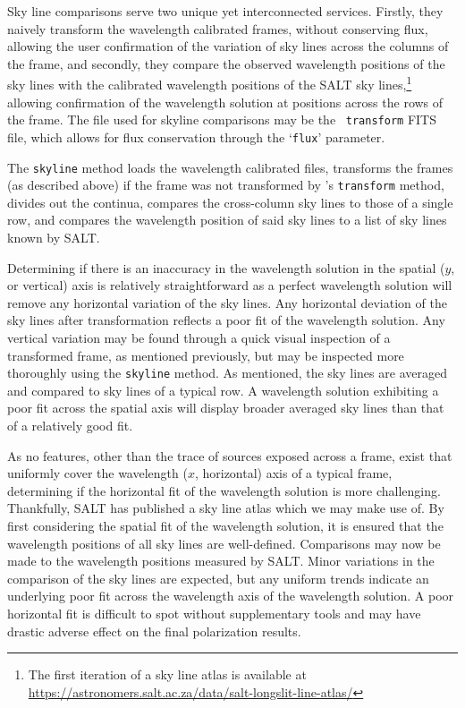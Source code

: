 Sky line comparisons serve two unique yet interconnected services. Firstly, they naively transform the wavelength calibrated frames, without conserving flux, allowing the user confirmation of the variation of sky lines across the columns of the frame, and secondly, they compare the observed wavelength positions of the sky lines with the calibrated wavelength positions of the \gls{SALT} sky lines,\footnote{The first iteration of a sky line atlas is available at \url{https://astronomers.salt.ac.za/data/salt-longslit-line-atlas/}} allowing confirmation of the wavelength solution at positions across the rows of the frame. The file used for skyline comparisons may be the \iraf\ \texttt{transform} \gls{FITS} file, which allows for flux conservation through the `\texttt{flux}' parameter.

The \texttt{skyline} method loads the wavelength calibrated files, transforms the frames (as described above) if the frame was not transformed by \iraf's \texttt{transform} method, divides out the continua, compares the cross-column sky lines to those of a single row, and compares the wavelength position of said sky lines to a list of sky lines known by \gls{SALT}.

Determining if there is an inaccuracy in the wavelength solution in the spatial ($y$, or vertical) axis is relatively straightforward as a perfect wavelength solution will remove any horizontal variation of the sky lines. Any horizontal deviation of the sky lines after transformation reflects a poor fit of the wavelength solution. Any vertical variation may be found through a quick visual inspection of a transformed frame, as mentioned previously, but may be inspected more thoroughly using the \texttt{skyline} method. As mentioned, the sky lines are averaged and compared to sky lines of a typical row. A wavelength solution exhibiting a poor fit across the spatial axis will display broader averaged sky lines than that of a relatively good fit.

As no features, other than the trace of sources exposed across a frame, exist that uniformly cover the wavelength ($x$, horizontal) axis of a typical frame, determining if the horizontal fit of the wavelength solution is more challenging. Thankfully, \gls{SALT} has published a sky line atlas which we may make use of. By first considering the spatial fit of the wavelength solution, it is ensured that the wavelength positions of all sky lines are well-defined. Comparisons may now be made to the wavelength positions measured by \gls{SALT}. Minor variations in the comparison of the sky lines are expected, but any uniform trends indicate an underlying poor fit across the wavelength axis of the wavelength solution. A poor horizontal fit is difficult to spot without supplementary tools and may have drastic adverse effect on the final polarization results.

